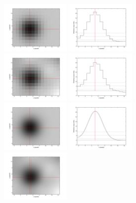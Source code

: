 \documentclass[letterpaper,preprint]{aastex}
\begin{document}
\begin{figure}[p!]
\begin{center}
\includegraphics[width=0.3\textwidth]{f03c-bw}
\includegraphics[width=0.3\textwidth]{f03d-bw} \\
\includegraphics[width=0.3\textwidth]{f03a-bw}
\includegraphics[width=0.3\textwidth]{f03b-bw} \\
\includegraphics[width=0.3\textwidth]{f04c-bw}
\includegraphics[width=0.3\textwidth]{f04d-bw} \\
\includegraphics[width=0.3\textwidth]{f04a-bw}

\end{center}
\end{figure}
\end{document}
